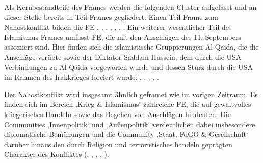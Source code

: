 Als Kernbestandteile des Frames werden die folgenden Cluster aufgefasst und an dieser Stelle bereits in Teil-Frames gegliedert: Einen Teil-Frame zum Nahostkonflikt bilden die FE , , , , , , . Ein weiterer wesentlicher Teil des Islamismus-Frames umfasst FE, die mit den Anschlägen des 11. Septembers assoziiert sind. Hier finden sich die islamistische Gruppierungen Al-Qaida, die die Anschläge verübte sowie der Diktator Saddam Hussein, dem durch die USA Verbindungen zu Al-Qaida vorgeworfen wurde und dessen Sturz durch die USA im Rahmen des Irakkrieges forciert wurde: , , , , .

Der Nahostkonflikt wird insgesamt ähnlich geframet wie im vorigen Zeitraum. Es finden sich im Bereich ‚Krieg \& Islamismus` zahlreiche FE, die auf gewaltvolles kriegerisches Handeln sowie das Begehen von Anschlägen hindeuten. Die Communities ‚Innenpolitik` und ‚Außenpolitik` verdeutlichen dabei insbesondere diplomatische Bemühungen und die Community ‚Staat, FdGO \& Gesellschaft` darüber hinaus den durch Religion und terroristisches handeln geprägten Charakter des Konfliktes (, , , , ).

